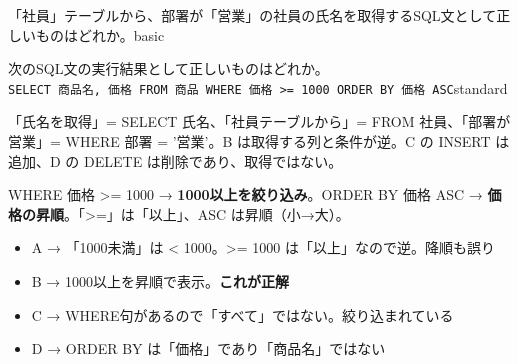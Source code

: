 
\begin{mondai}{「社員」テーブルから、部署が「営業」の社員の氏名を取得するSQL文として正しいものはどれか。}{basic}
\end{mondai}

\begin{mondai}{次のSQL文の実行結果として正しいものはどれか。\\
\texttt{SELECT 商品名, 価格 FROM 商品 WHERE 価格 >= 1000 ORDER BY 価格 ASC}}{standard}
\end{mondai}

\kaitoupage


\begin{kaisetsu}
「氏名を取得」= SELECT 氏名、「社員テーブルから」= FROM 社員、「部署が営業」= WHERE 部署 = '営業'。B は取得する列と条件が逆。C の INSERT は追加、D の DELETE は削除であり、取得ではない。
\end{kaisetsu}


\begin{kaisetsu}
WHERE 価格 >= 1000 → \textbf{1000以上を絞り込み}。ORDER BY 価格 ASC → \textbf{価格の昇順}。「>=」は「以上」、ASC は昇順（小→大）。
\end{kaisetsu}

\begin{goutoubun}
\begin{itemize}
  \item A → 「1000未満」は < 1000。>= 1000 は「以上」なので逆。降順も誤り
  \item B → 1000以上を昇順で表示。\textbf{これが正解}
  \item C → WHERE句があるので「すべて」ではない。絞り込まれている
  \item D → ORDER BY は「価格」であり「商品名」ではない
\end{itemize}
\end{goutoubun}


